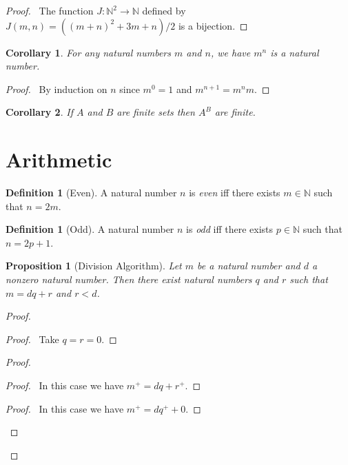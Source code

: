 \documentclass{book}
\let\qed\relax
\newtheorem{prop}[ax]{Proposition}
\newtheorem{cor}{Corollary}[ax]
\theoremstyle{definition}
\newtheorem{df}[ax]{Definition}
\begin{document}
\begin{proof}
\pf\ The function $J : \mathbb{N}^2 \rightarrow \mathbb{N}$ defined by $J(m,n) = ((m+n)^2 + 3m + n)/2$ is a bijection. \qed
\end{proof}

\begin{cor}
For any natural numbers $m$ and $n$, we have $m^n$ is a natural number.
\end{cor}

\begin{proof}
\pf\ By induction on $n$ since $m^0 = 1$ and $m^{n+1} = m^n m$. \qed
\end{proof}

\begin{cor}
If $A$ and $B$ are finite sets then $A^B$ are finite.
\end{cor}

\section{Arithmetic}

\begin{df}[Even]
A natural number $n$ is \emph{even} iff there exists $m \in \mathbb{N}$ such that $n = 2m$.
\end{df}

\begin{df}[Odd]
A natural number $n$ is \emph{odd} iff there exists $p \in \mathbb{N}$ such that $n = 2p+1$.
\end{df}

\begin{prop}[Division Algorithm]
Let $m$ be a natural number and $d$ a nonzero natural number. Then there exist natural numbers $q$ and $r$ such that $m = dq + r$ and $r < d$.
\end{prop}

\begin{proof}
\pf
{}
\begin{proof}
	\pf\ Take $q = r = 0$.
\end{proof}
\begin{proof}
	\begin{proof}
		\pf\ In this case we have $m^+ = dq + r^+$.
	\end{proof}
	\begin{proof}
		\pf\ In this case we have $m^+ = dq^+ + 0$.
	\end{proof}
\end{proof}
\qed
\end{proof}
\end{document}
